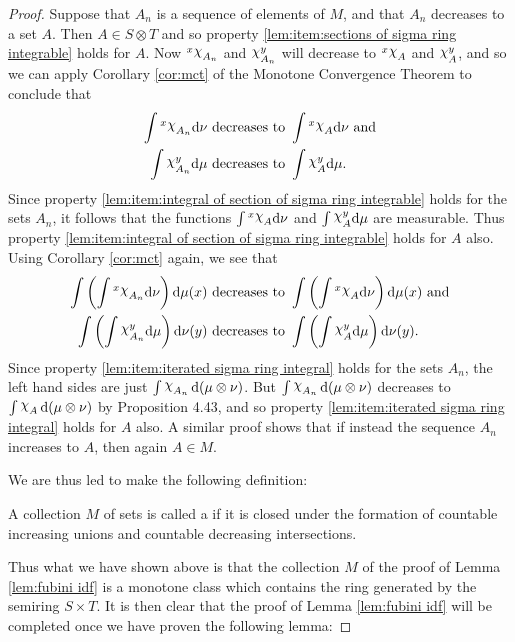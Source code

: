 \begin{proof}
Suppose that $A_n$ is a sequence of elements of $M$, and that $A_n$ decreases to a set $A$. Then $A\in S\otimes T$ and so property \ref{lem:item:sections of sigma ring integrable} holds for $A$. Now $\xsec{\idf{A_n}}{x}$ and $\ysec{\idf{A_n}}{y}$ will decrease to $\xsec{\idf{A}}{x}$ and $\ysec{\idf{A}}{y}$, and so we can apply Corollary \ref{cor:mct} of the Monotone Convergence Theorem to conclude that
\begin{align*}
    \int\xsec{\idf{A_n}}{x}\dd\nu&\text { decreases to }\int\xsec{\idf{A}}{x}\dd\nu\text{ and}\\
    \int\ysec{\idf{A_n}}{y}\dd\mu&\text { decreases to }\int\ysec{\idf{A}}{y}\dd\mu.
\end{align*}
Since property \ref{lem:item:integral of section of sigma ring integrable} holds for the sets $A_n$, it follows that the functions $\int\xsec{\idf{A}}{x}\dd\nu$ and $\int\ysec{\idf{A}}{y}\dd\mu$ are measurable. Thus property \ref{lem:item:integral of section of sigma ring integrable} holds for $A$ also. Using Corollary \ref{cor:mct} again, we see that
\begin{align*}
    \int\br{\int\xsec{\idf{A_n}}{x}\dd\nu}\dd\mu(x)&\text { decreases to }\int\br{\int\xsec{\idf{A}}{x}\dd\nu}\dd\mu(x)\text{ and}\\
    \int\br{\int\ysec{\idf{A_n}}{y}\dd\mu}\dd\nu(y)&\text { decreases to }\int\br{\int\ysec{\idf{A}}{y}\dd\mu}\dd\nu(y).
\end{align*}
Since property \ref{lem:item:iterated sigma ring integral} holds for the sets $A_n$, the left hand sides are just $\int\idf{A_n}\dd(\mu\otimes\nu)$. But $\int\idf{A_n}\dd(\mu\otimes\nu)$ decreases to $\int\idf{A}\dd(\mu\otimes\nu)$ by Proposition 4.43, and so property \ref{lem:item:iterated sigma ring integral} holds for $A$ also. A similar proof shows that if instead the sequence $A_n$ increases to $A$, then again $A\in M$.

We are thus led to make the following definition:

\begin{definition}
A collection $M$ of sets is called a  if it is closed under the formation of countable increasing unions and countable decreasing intersections.
\end{definition}

Thus what we have shown above is that the collection $M$ of the proof of Lemma \ref{lem:fubini idf} is a monotone class which contains the ring generated by the semiring $S\times T$. It is then clear that the proof of Lemma \ref{lem:fubini idf} will be completed once we have proven the following lemma:


\end{proof}

